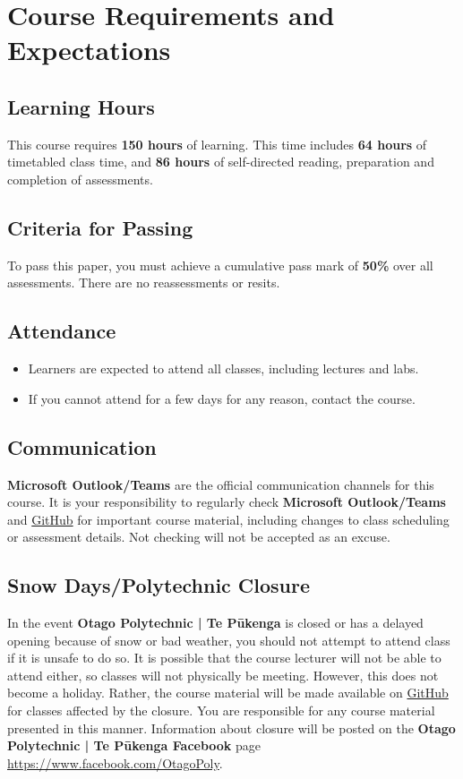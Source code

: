 \documentclass{article}
\begin{document}
\section*{Course Requirements and Expectations}

\subsection*{Learning Hours}
This course requires \textbf{150 hours} of learning. This time includes \textbf{64 hours} of timetabled class time, and \textbf{86 hours} of self-directed reading, preparation and completion of assessments.  

\subsection*{Criteria for Passing}
To pass this paper, you must achieve a cumulative pass mark of \textbf{50\%} over all assessments. There are no reassessments or resits.

\subsection*{Attendance}
\begin{itemize}
	\item Learners are expected to attend all classes, including lectures and labs.
	\item If you cannot attend for a few days for any reason, contact the course.
\end{itemize}

\subsection*{Communication}
\textbf{Microsoft Outlook/Teams} are the official communication channels for this course. It is your responsibility to regularly check \textbf{Microsoft Outlook/Teams} and \href{https://github.com/otago-polytechnic-bit-courses/ID721001-mobile-application-development}{GitHub} for important course material, including changes to class scheduling or assessment details. Not checking will not be accepted as an excuse.

\subsection*{Snow Days/Polytechnic Closure}
In the event \textbf{Otago Polytechnic | Te Pūkenga} is closed or has a delayed opening because of snow or bad weather, you should not attempt to attend class if it is unsafe to do so. It is possible that the course lecturer will not be able to attend either, so classes will not physically be meeting. However, this does not become a holiday. Rather, the course material will be made available on \href{https://github.com/otago-polytechnic-bit-courses/ID721001-mobile-application-development}{GitHub} for classes affected by the closure. You are responsible for any course material presented in this manner. Information about closure will be posted on the \textbf{Otago Polytechnic | Te Pūkenga Facebook} page \href{https://www.facebook.com/OtagoPoly}{https://www.facebook.com/OtagoPoly}.
\end{document}
